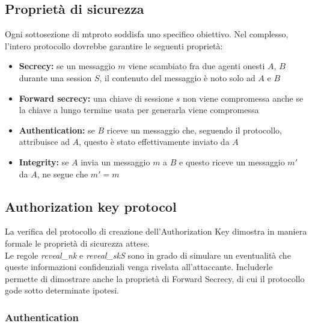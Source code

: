 \subsection{Proprietà di sicurezza}
Ogni sottosezione di \gls{mtproto} soddisfa uno specifico obiettivo.
Nel complesso, l'intero protocollo dovrebbe garantire le seguenti proprietà:
\begin{itemize}
    \item \textbf{Secrecy:} se un messaggio $m$ viene scambiato fra due agenti onesti $A$, $B$ durante una session $S$,
          il contenuto del messaggio è noto solo ad $A$ e $B$
    \item \textbf{Forward secrecy:} una chiave di sessione $s$ non viene compromessa
          anche se la chiave a lungo termine usata per generarla viene compromessa
    \item \textbf{Authentication:} se $B$ riceve un messaggio che, seguendo il protocollo,
          attribuisce ad $A$, questo è stato effettivamente inviato da $A$
    \item \textbf{Integrity:} se $A$ invia un messaggio $m$ a $B$
          e questo riceve un messaggio $m'$ da $A$, ne segue che $m' = m$
\end{itemize}

\subsection{Authorization key protocol}
La verifica del protocollo di creazione dell'Authorization Key dimostra in maniera formale le proprietà di sicurezza attese. \\
Le regole \textit{reveal\_nk} e \textit{reveal\_skS} sono in grado di simulare un eventualità che queste informazioni confidenziali
venga rivelata all'attaccante. 
Includerle permette di dimostrare anche la proprietà di Forward Secrecy, di cui il protocollo gode sotto determinate ipotesi. 

\subsubsection{Authentication}





